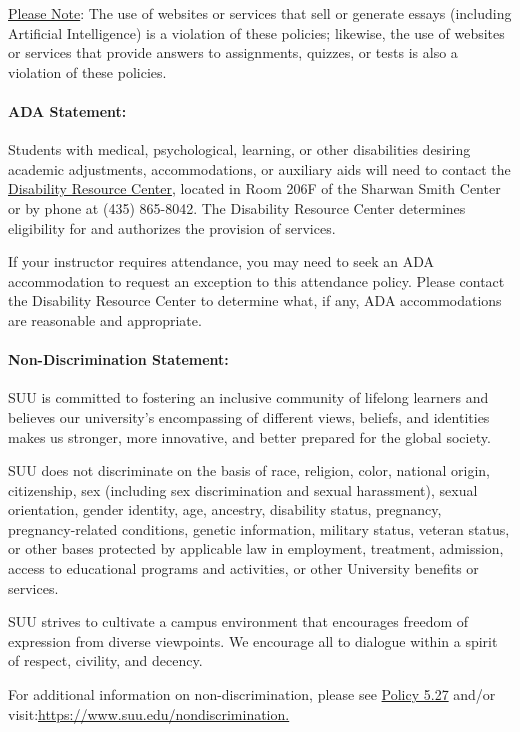 \documentclass[12pt, letterpaper]{article}
\begin{document}
\noindent
\underline{Please Note}: The use of websites or services that sell or generate essays (including Artificial Intelligence) is a violation of these policies; likewise, the use of websites or services that provide answers to assignments, quizzes, or tests is also a violation of these policies.

\paragraph{ADA Statement:}
Students with medical, psychological, learning, or other disabilities desiring academic adjustments, accommodations, or auxiliary aids will need to contact the \href{https://www.suu.edu/disabilityservices/}{Disability Resource Center}, located in Room 206F of the Sharwan Smith Center or by phone at (435) 865-8042. The Disability Resource Center determines eligibility for and authorizes the provision of services.

\noindent
If your instructor requires attendance, you may need to seek an ADA accommodation to request an exception to this attendance policy. Please contact the Disability Resource Center to determine what, if any, ADA accommodations are reasonable and appropriate.


\paragraph{Non-Discrimination Statement:}
SUU is committed to fostering an inclusive community of lifelong learners and believes our university's encompassing of different views, beliefs, and identities makes us stronger, more innovative, and better prepared for the global society. 

\noindent
SUU does not discriminate on the basis of race, religion, color, national origin, citizenship, sex (including sex discrimination and sexual harassment), sexual orientation, gender identity, age, ancestry, disability status, pregnancy, pregnancy-related conditions, genetic information, military status, veteran status, or other bases protected by applicable law in employment, treatment, admission, access to educational programs and activities, or other University benefits or services.

\noindent
SUU strives to cultivate a campus environment that encourages freedom of expression from diverse viewpoints. We encourage all to dialogue within a spirit of respect, civility, and decency. 

\noindent
For additional information on non-discrimination, please see \href{https://www.suu.edu/policies/05/27.html}{Policy 5.27} and/or visit:\newline \href{https://www.suu.edu/nondiscrimination.}{https://www.suu.edu/nondiscrimination.}
\end{document}

